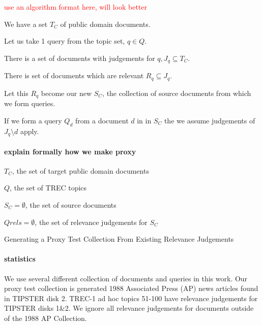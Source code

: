 \documentclass{mpaper}
\newcommand{\remove}[1]{\textcolor{red}{#1}}
\begin{document}
\remove{use an algorithm format here, will look better}

We have a set $T_C$ of public domain documents.

Let us take 1 query from the topic set, $ q \in Q $.

There is a set of documents with judgements for $q, J_q \subseteq T_C$.

There is set of documents which are relevant $R_q \subseteq J_q$.

Let this $R_q$ become our new $S_C$, the collection of source documents from which we form queries.

If we form a query $ Q_d $ from a document $ d $ in in $ S_C $ the we assume judgements of $ J_q \setminus d$ apply. 

\paragraph{explain formally how we make proxy}
\begin{algorithm}
\SetAlgoLined
{}
 $T_C$, the set of target public domain documents
 
 $ Q $, the set of TREC topics
 
 $S_C = \emptyset$, the set of source documents
 
 $Qrels = \emptyset $, the set of relevance judgements for $S_C$
 
 \caption{Generating a Proxy Test Collection From Existing Relevance Judgements}
\end{algorithm}

\paragraph{statistics}
We use several different collection of documents and queries in this work.
Our proxy test collection is generated 1988 Associated Press (AP) news articles found in TIPSTER disk 2.
TREC-1 ad hoc topics 51-100 have relevance judgements for  TIPSTER disks 1\&2. We ignore all relevance judgements for documents outside of the 1988 AP Collection.
\end{document}
